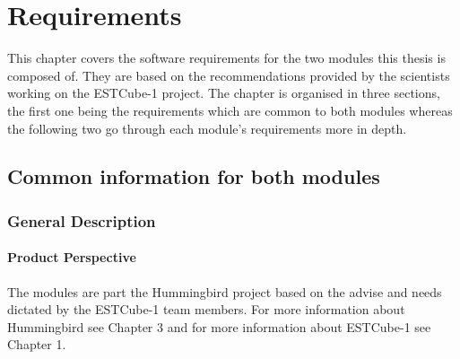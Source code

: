 
\lstset{breaklines=true, breakatwhitespace=true}
\lstset{numbers=left, numberstyle=\scriptsize}
 


\chapter{Requirements}

This chapter covers the software requirements for the two modules this thesis is composed of. They are based on the recommendations provided by the scientists working on the ESTCube-1 project. The chapter is organised in three sections, the first one being the requirements which are common to both modules whereas the following two  go through each module's requirements more in depth.


\section{Common information for both modules}

\subsection{General Description}
\subsubsection{Product Perspective}
The modules are part the Hummingbird project based on the advise and needs dictated by the ESTCube-1 team members. For more information about Hummingbird see Chapter 3 and for more information about ESTCube-1 see Chapter 1. 

